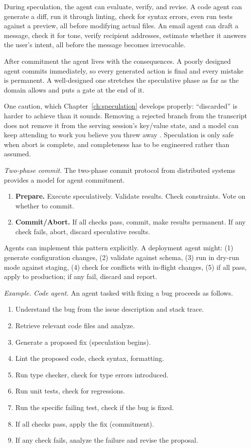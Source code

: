 During speculation, the agent can evaluate, verify, and revise. A code agent can generate a diff, run it through linting, check for syntax errors, even run tests against a preview, all before modifying actual files. An email agent can draft a message, check it for tone, verify recipient addresses, estimate whether it answers the user's intent, all before the message becomes irrevocable.

After commitment the agent lives with the consequences. A poorly designed agent commits immediately, so every generated action is final and every mistake is permanent. A well-designed one stretches the speculative phase as far as the domain allows and puts a gate at the end of it.

One caution, which Chapter~\ref{ch:speculation} develops properly: ``discarded'' is harder to achieve than it sounds. Removing a rejected branch from the transcript does not remove it from the serving session's key/value state, and a model can keep attending to work you believe you threw away \cite{abortedkv2026}. Speculation is only safe when abort is complete, and completeness has to be engineered rather than assumed.

\textit{Two-phase commit.} The two-phase commit protocol from distributed systems \cite{gray1978notes} provides a model for agent commitment.

\begin{enumerate}
\item \textbf{Prepare.} Execute speculatively. Validate results. Check constraints. Vote on whether to commit.
\item \textbf{Commit/Abort.} If all checks pass, commit, make results permanent. If any check fails, abort, discard speculative results.
\end{enumerate}

Agents can implement this pattern explicitly. A deployment agent might: (1) generate configuration changes, (2) validate against schema, (3) run in dry-run mode against staging, (4) check for conflicts with in-flight changes, (5) if all pass, apply to production; if any fail, discard and report.

\textit{Example. Code agent.} An agent tasked with fixing a bug proceeds as follows.

\begin{enumerate}
\item Understand the bug from the issue description and stack trace.
\item Retrieve relevant code files and analyze.
\item Generate a proposed fix (speculation begins).
\item Lint the proposed code, check syntax, formatting.
\item Run type checker, check for type errors introduced.
\item Run unit tests, check for regressions.
\item Run the specific failing test, check if the bug is fixed.
\item If all checks pass, apply the fix (commitment).
\item If any check fails, analyze the failure and revise the proposal.
\end{enumerate}

